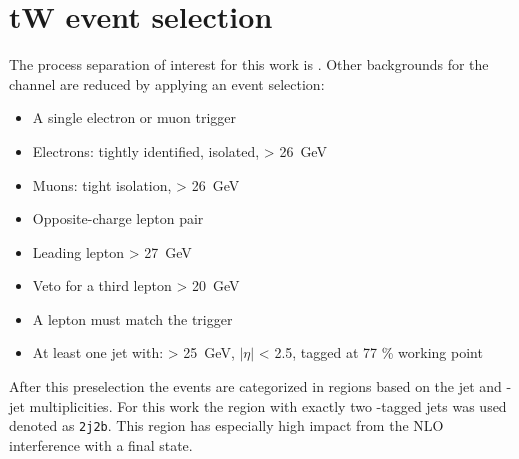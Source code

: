 




\section{tW event selection}

The process separation of interest for this work is \tW \ttbar. Other backgrounds for the \tW channel are reduced by applying an event selection:


\begin{itemize}
\item A single electron or muon trigger
\item Electrons: tightly identified, isolated, \ET > \SI{26}{\giga \electronvolt}
\item Muons: tight isolation, \pT > \SI{26}{\giga \electronvolt}
\item Opposite-charge lepton pair
\item Leading lepton \pT > \SI{27}{\giga \electronvolt}
\item Veto for a third lepton \pT > \SI{20}{\giga \electronvolt}
\item A lepton must match the trigger
\item At least one jet with: \pT > \SI{25}{\giga \electronvolt}, $|\eta|$ < \num{2.5}, tagged at \num{77} \% working point
\end{itemize}

After this preselection the events are categorized in regions based on the jet and \Pbottom-jet multiplicities. For this work the region with exactly two \Pbottom-tagged jets was used denoted as \texttt{2j2b}. This region has especially high impact from the NLO interference with a \Ptop\APtop final state.

